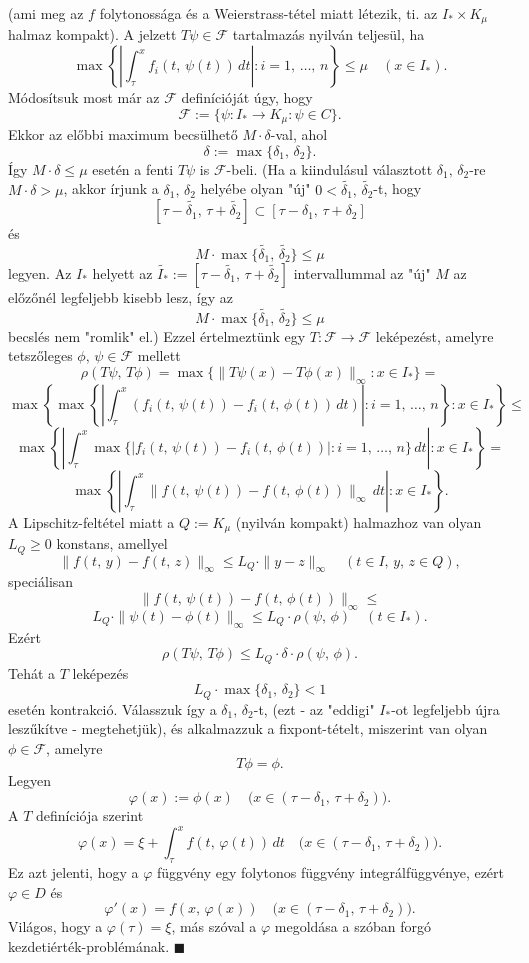 (ami meg az $f$ folytonossága és a Weierstrass-tétel miatt létezik, ti. az $I_* \times K_\mu$ halmaz kompakt). A jelzett $T\psi \in \mathcal{F}$ tartalmazás nyilván teljesül, ha
\[
\max \left\{  \left| \int_\tau^x f_i(t, \, \psi(t)) \, dt \right| : i = 1, \, \dots, \, n \right\} \leq \mu \quad (x \in I_*).
\]
Módosítsuk most már az $\mathcal{F}$ definícióját úgy, hogy
\[
\mathcal{F} := \{ \psi : I_* \to K_\mu : \psi \in C \}.
\]
Ekkor az előbbi maximum becsülhető $M \cdot \delta$-val, ahol
\[
\delta := \max\{\delta_1, \, \delta_2\}.
\]
Így $M \cdot \delta \leq \mu$ esetén a fenti $T\psi$ is $\mathcal{F}$-beli. (Ha a kiindulásul választott $\delta_1, \, \delta_2$-re $M \cdot \delta > \mu$, akkor írjunk a $\delta_1, \, \delta_2$ helyébe olyan "új" $0 < \tilde{\delta_1}, \, \tilde{\delta_2}$-t, hogy
\[
[\tau - \tilde{\delta_1}, \, \tau + \tilde{\delta_2}] \subset [\tau - \delta_1, \, \tau + \delta_2]
\]
és
\[
M \cdot \max \{ \tilde{\delta_1}, \, \tilde{\delta_2} \} \leq \mu
\]
legyen. Az $I_*$ helyett az $\tilde{I_*} := [\tau - \tilde{\delta_1}, \, \tau + \tilde{\delta_2}]$ intervallummal az "új" $M$ az előzőnél legfeljebb kisebb lesz, így az
\[
M \cdot \max \{ \tilde{\delta_1}, \, \tilde{\delta_2}\} \leq \mu
\]
becslés nem "romlik" el.)
Ezzel értelmeztünk egy $T : \mathcal{F} \to \mathcal{F}$ leképezést, amelyre tetszőleges $\phi, \, \psi \in \mathcal{F}$ mellett
\[
\rho(T\psi, \, T\phi) = \max \big\{ \| T\psi(x) - T\phi(x)\|_\infty : x \in I_* \big\} =
\]
\[
\max \left\{  \max \left\{  \left| \int_\tau^x (f_i(t, \, \psi(t)) - f_i(t, \, \phi(t)) \, dt) \right| : i = 1, \, \dots, \, n \right\} : x \in I_* \right\} \leq
\]
\[
\max \left\{  \left| \int_\tau^x \max \{ |f_i(t, \, \psi(t)) - f_i(t, \, \phi(t))| : i = 1, \, \dots, \, n \} \, dt \right| : x \in I_* \right\} =
\]
\[
\max \left\{ \left| \int_\tau^x \| f(t, \, \psi(t)) - f(t, \, \phi(t))\|_\infty \, dt \right| : x \in I_* \right\}.
\]
A Lipschitz-feltétel miatt a $Q := K_\mu$ (nyilván kompakt) halmazhoz van olyan $L_Q \geq 0$ konstans, amellyel
\[
\| f(t, \, y) - f(t, \, z)\|_\infty \leq L_Q \cdot \| y-z \|_\infty \quad (t \in I, \, y, \, z \in Q),
\]
speciálisan
\[
\| f(t, \, \psi(t)) - f(t, \, \phi(t))\|_\infty \leq
\]
\[
L_Q \cdot \| \psi(t) - \phi(t) \|_\infty \leq L_Q \cdot \rho(\psi, \, \phi) \quad (t \in I_*).
\]
Ezért
\[
\rho(T\psi, \, T\phi) \leq L_Q \cdot \delta \cdot \rho(\psi, \, \phi).
\]
Tehát a $T$ leképezés
\[
L_Q \cdot \max \{\delta_1, \, \delta_2\} < 1
\]
esetén kontrakció. Válasszuk így a $\delta_1, \, \delta_2$-t, (ezt - az "eddigi" $I_*$-ot legfeljebb újra leszűkítve - megtehetjük), és alkalmazzuk a fixpont-tételt, miszerint van olyan $\phi \in \mathcal{F}$, amelyre
\[
T\phi = \phi.
\]
Legyen
\[
\varphi(x) := \phi(x) \quad \big( x \in (\tau - \delta_1, \, \tau + \delta_2) \big).
\]
A $T$ definíciója szerint
\[
\varphi(x) = \xi + \int_\tau^x f(t, \, \varphi(t)) \, dt \quad \big( x \in (\tau - \delta_1, \, \tau + \delta_2) \big).
\]
Ez azt jelenti, hogy a $\varphi$ függvény egy folytonos függvény integrálfüggvénye, ezért $\varphi \in D$ és
\[
\varphi'(x) = f(x, \, \varphi(x)) \quad \big( x \in (\tau - \delta_1, \, \tau + \delta_2) \big).
\]
Világos, hogy a $\varphi(\tau) = \xi$, más szóval a $\varphi$ megoldása a szóban forgó kezdetiérték-problémának. $\blacksquare$\\


